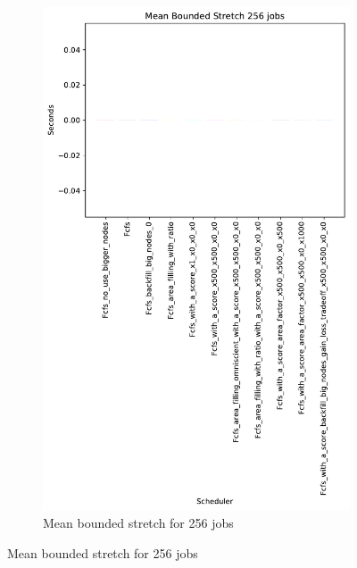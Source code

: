 \documentclass[a4paper]{article}
\begin{document}
\begin{figure}[H]
\begin{subfigure}[b]{0.4\linewidth}\centering\includegraphics[width=0.7\linewidth]{MBSS/plot/Results_Size_And_Data_2022-03-01->2022-03-03_V10000_Mean_Stretch_With_a_Minimum_256_450_128_32_256_4_1024.pdf}\caption{Mean bounded stretch for 256 jobs}\label{45}\end{subfigure}

\end{figure}
\end{document}
